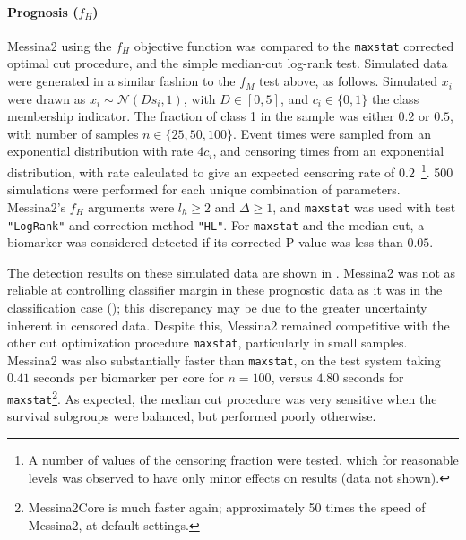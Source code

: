 \documentclass[dissertation.tex]{subfiles}
\begin{document}
\paragraph{Prognosis ($f_H$)}
Messina2 using the $f_H$ objective function was compared to the \texttt{maxstat} corrected optimal cut procedure, and the simple median-cut log-rank test.  Simulated data were generated in a similar fashion to the $f_M$ test above, as follows.  Simulated $x_i$ were drawn as $x_i \sim \mathcal{N}(D s_i, 1)$, with $D \in [0, 5]$, and $c_i \in \{0, 1\}$ the class membership indicator.  The fraction of class 1 in the sample was either $0.2$ or $0.5$, with number of samples $n \in \{25, 50, 100\}$.  Event times were sampled from an exponential distribution with rate $4 c_i$, and censoring times from an exponential distribution, with rate calculated to give an expected censoring rate of $0.2$~\footnote{A number of values of the censoring fraction were tested, which for reasonable levels was observed to have only minor effects on results (data not shown).}.  500 simulations were performed for each unique combination of parameters.  Messina2's $f_H$ arguments were $l_h \geq 2$ and $\Delta \geq 1$, and \texttt{maxstat} was used with test \texttt{"LogRank"} and correction method \texttt{"HL"}.  For \texttt{maxstat} and the median-cut, a biomarker was considered detected if its corrected P-value was less than $0.05$.

The detection results on these simulated data are shown in .  Messina2 was not as reliable at controlling classifier margin in these prognostic data as it was in the classification case (); this discrepancy may be due to the greater uncertainty inherent in censored data.  Despite this, Messina2 remained competitive with the other cut optimization procedure \texttt{maxstat}, particularly in small samples.  Messina2 was also substantially faster than \texttt{maxstat}, on the test system taking $0.41$ seconds per biomarker per core for $n = 100$, versus $4.80$ seconds for \texttt{maxstat}\footnote{Messina2Core is much faster again; approximately 50 times the speed of Messina2, at default settings.}.  As expected, the median cut procedure was very sensitive when the survival subgroups were balanced, but performed poorly otherwise.
\end{document}
